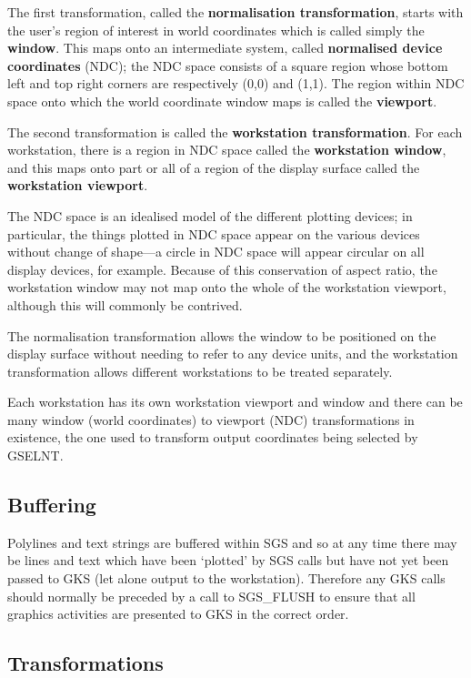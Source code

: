 \documentclass[11pt]{article}
\newcommand{\htmlref}[2]{#1}
\begin{document}
The first transformation, called the
{\bf normalisation transformation}, starts with the user's region
of interest in world coordinates which is called simply
the {\bf window}.  This maps onto an intermediate
system, called {\bf normalised device coordinates} (NDC);  the
NDC space consists
of a square region whose bottom left
and top right corners are respectively (0,0) and (1,1).  The
region within NDC space onto which the world coordinate
window maps is called the {\bf viewport}.

The second transformation is called the {\bf workstation
transformation}.  For each workstation, there
is a region in NDC space called the {\bf workstation
window}, and this maps onto part or
all of a region of the
display surface called the {\bf workstation viewport}.

The NDC space is an idealised model of the different
plotting devices;  in particular, the things plotted
in NDC space appear on the various devices without
change of shape---a circle in NDC space will appear
circular on all display devices, for example.  Because of this
conservation of aspect ratio, the workstation window
may not map onto the whole of the workstation
viewport, although this will commonly
be contrived.

The normalisation transformation allows
the window to be positioned
on the display surface without needing to refer to any
device units, and the workstation transformation
allows different workstations
to be treated separately.

Each workstation has its own workstation viewport and window and there can
be many window (world coordinates) to viewport (NDC)
transformations in existence,
the one used to transform output coordinates being selected by GSELNT.

\subsection* {Buffering}

Polylines and text strings are buffered within SGS and so at any time there
may be lines and text which have been `plotted' by SGS calls but have not yet
been passed to GKS (let alone output to the workstation).
Therefore any GKS calls should normally be preceded by a call to
\htmlref{SGS\_FLUSH}{SGS_FLUSH} to
ensure that all graphics activities are presented to GKS  in the correct order.

\subsection* {Transformations}
\end{document}
